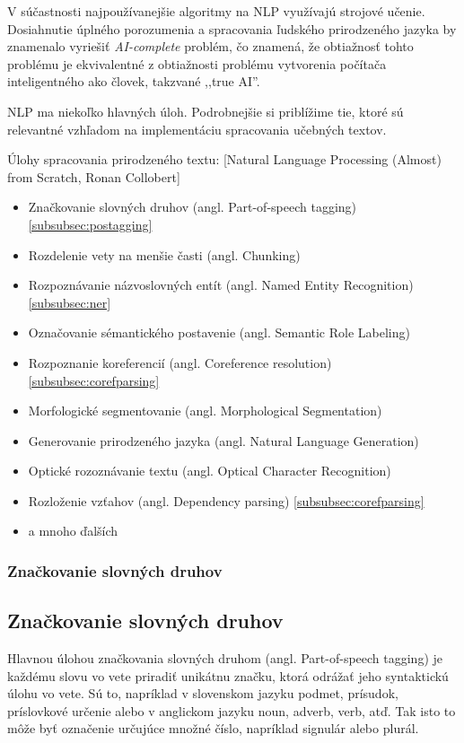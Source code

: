 V súčastnosti najpoužívanejšie algoritmy na NLP využívajú strojové učenie. Dosiahnutie úplného porozumenia a spracovania ľudského prirodzeného jazyka by znamenalo vyriešiť \textit{AI-complete} problém, čo znamená, že obtiažnosť tohto problému je ekvivalentné z obtiažnosti problému vytvorenia počítača inteligentného ako človek, takzvané ,,true AI''.

NLP ma niekoľko hlavných úloh. Podrobnejšie si priblížime tie, ktoré sú relevantné vzhľadom na implementáciu spracovania učebných textov.

Úlohy spracovania prirodzeného textu: [Natural Language Processing (Almost) from Scratch, Ronan Collobert]
\begin{itemize}
	\item Značkovanie slovných druhov (angl. Part-of-speech tagging) \ref{subsubsec:postagging}
	\item Rozdelenie vety na menšie časti (angl. Chunking)
	\item Rozpoznávanie názvoslovných entít (angl. Named Entity Recognition) \ref{subsubsec:ner}
	\item Označovanie sémantického postavenie (angl. Semantic Role Labeling)
	\item Rozpoznanie koreferencií (angl. Coreference resolution) \ref{subsubsec:corefparsing}
	\item Morfologické segmentovanie (angl. Morphological Segmentation)
	\item Generovanie prirodzeného jazyka (angl. Natural Language Generation)
	\item Optické rozoznávanie textu (angl. Optical Character Recognition)
	\item Rozloženie vzťahov (angl. Dependency parsing) \ref{subsubsec:corefparsing}
	\item a mnoho ďalších
\end{itemize}

{
	\subsubsection{Značkovanie slovných druhov}
}
{
	\subsection{Značkovanie slovných druhov}
}
\label{subsubsec:postagging}
Hlavnou úlohou značkovania slovných druhom (angl. Part-of-speech tagging) je každému slovu vo vete priradiť unikátnu značku, ktorá odrážať jeho syntaktickú úlohu vo vete. Sú to, napríklad v slovenskom jazyku podmet, prísudok, príslovkové určenie alebo v anglickom jazyku noun, adverb, verb, atď. Tak isto to môže byť označenie určujúce množné číslo, napríklad signulár alebo plurál.

